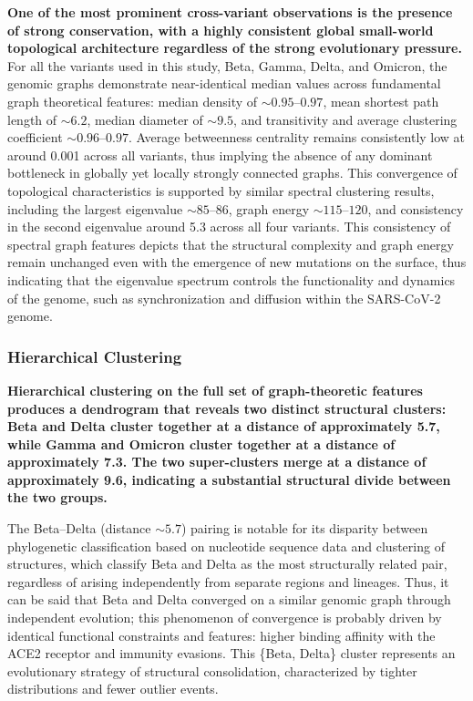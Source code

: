 \documentclass[conference]{IEEEtran}
\begin{document}
\textbf{One of the most prominent cross-variant observations is the presence of strong conservation, with a highly consistent global small-world topological architecture regardless of the strong evolutionary pressure.} For all the variants used in this study, Beta, Gamma, Delta, and Omicron, the genomic graphs demonstrate near-identical median values across fundamental graph theoretical features: median density of $\sim 0.95$--$0.97$, mean shortest path length of $\sim 6.2$, median diameter of $\sim 9.5$, and transitivity and average clustering coefficient $\sim 0.96$--$0.97$. Average betweenness centrality remains consistently low at around 0.001 across all variants, thus implying the absence of any dominant bottleneck in globally yet locally strongly connected graphs. This convergence of topological characteristics is supported by similar spectral clustering results, including the largest eigenvalue $\sim 85$--$86$, graph energy $\sim 115$--$120$, and consistency in the second eigenvalue around 5.3 across all four variants. This consistency of spectral graph features depicts that the structural complexity and graph energy remain unchanged even with the emergence of new mutations on the surface, thus indicating that the eigenvalue spectrum controls the functionality and dynamics of the genome, such as synchronization and diffusion within the SARS-CoV-2 genome.

\subsubsection{Hierarchical Clustering}

\textbf{Hierarchical clustering on the full set of graph-theoretic features produces a dendrogram that reveals two distinct structural clusters: Beta and Delta cluster together at a distance of approximately 5.7, while Gamma and Omicron cluster together at a distance of approximately 7.3. The two super-clusters merge at a distance of approximately 9.6, indicating a substantial structural divide between the two groups.} 

The Beta--Delta (distance $\sim 5.7$) pairing is notable for its disparity between phylogenetic classification based on nucleotide sequence data and clustering of structures, which classify Beta and Delta as the most structurally related pair, regardless of arising independently from separate regions and lineages. Thus, it can be said that Beta and Delta converged on a similar genomic graph through independent evolution; this phenomenon of convergence is probably driven by identical functional constraints and features: higher binding affinity with the ACE2 receptor and immunity evasions. This \{Beta, Delta\}  cluster represents an evolutionary strategy of structural consolidation, characterized by tighter distributions and fewer outlier events.
\end{document}
